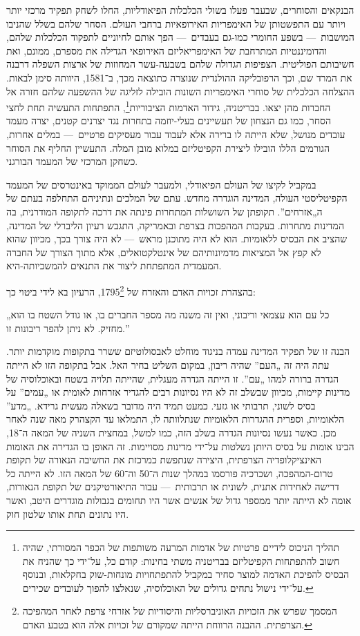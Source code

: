 הבנקאים והסוחרים, שבעבר פעלו בשולי הכלכלות הפיאודליות, החלו לשחק תפקיד מרכזי יותר ויותר עם התפשטותן של האימפריות האירופאיות ברחבי העולם. הסחר שלהם בשלל שהניבו המושבות~— בשפע החומרי כמו-גם בעבדים~— הפך אותם לחיוניים לתפקוד הכלכלות שלהם, והדומיננטיות המתרחבת של האימפריאליזם האירופאי הגדילה את מספרם, ממונם, ואת חשיבותם הפוליטית. הצפיפות הגדולה שלהם בשבעה-עשר המחוזות של ארצות השפלה דרבנה את המרד שם, וכך הרפובליקה ההולנדית שנוצרה כתוצאה מכך, ב־1581, היוותה סימן לבאות. ההצלחה הכלכלית של סוחרי האימפריות השונות הובילה לזליגה של ההשפעה שלהם חזרה אל החברות מהן יצאו. בבריטניה, גידור האדמות הציבוריות\footnote{תהליך הניכוס לידיים פרטיות של אדמות המרעה משותפות של הכפר המסורתי, שהיה חשוב להתפתחות הקפיטליזם בבריטניה משתי בחינות: קודם כל, על־ידי כך שהניח את הבסיס להפיכת האדמה למוצר סחיר במקביל להתפתחויות מונחות-שוק בחקלאות, ובנוסף על־ידי נישול נתחים גדולים של האוכלוסיה, שנאלצו להפוך לעובדים שכירים.}, התפתחות התעשיה תחת לחצי הסחר, כמו גם הנצחון של תעשיינים בעלי-יוזמה בתחרות נגד יצרנים קטנים, יצרה מעמד עובדים מנושל, שלא הייתה לו ברירה אלא לעבוד עבור מעסיקים פרטיים~— במלים אחרות, הגורמים הללו הובילו ליצירת הקפיטליזם במלוא מובן המלה. התעשיין החליף את הסוחר כשחקן המרכזי של המעמד הבורגני.

במקביל לקיצו של העולם הפיאודלי, ולמעבר לעולם הממוקד באינטרסים של המעמד הקפיטליסטי העולה, המדינה הוגדרה מחדש. עתם של המלכים ונתיניהם התחלפה בעתם של ה„אזרחים”. תקופתן של השושלות המתחרות פינתה את דרכה לתקופה המודרנית, בה המדינות מתחרות. בעקבות המהפכות בצרפת ובאמריקה, התגבש רעיון הליברלי של המדינה, שהציב את הבסיס ללאומיות. הוא לא היה מתוכנן מראש~— לא היה צורך בכך, מכיוון שהוא לא קפץ אל המציאות מדמיונותיהם של אינטלקטואלים, אלא מתוך הצורך של החברה המעמדית המתפתחת ליצור את התנאים להמשכיותה-היא.

בהצהרת זכויות האדם והאזרח של 1795\footnote{המסמך שפרש את הזכויות האוניברסליות והיסודיות של אזרחי צרפת לאחר המהפיכה הצרפתית. ההבנה הרווחת הייתה שמקורם של זכויות אלה הוא בטבע האדם.}, הרעיון בא לידי ביטוי כך: 

„כל עם הוא עצמאי וריבוני, ואין זה משנה מה מספר החברים בו, או גודל השטח בו הוא מחזיק. לא ניתן להפר ריבונות זו.”

הבנה זו של תפקיד המדינה עמדה בניגוד מוחלט לאבסולוטיזם ששרר בתקופות מוקדמות יותר. עתה היה זה „העם” שהיה ריבון, במקום השליט בחיר האל. אבל בתקופה הזו לא הייתה הגדרה ברורה למהו „עם”. זו הייתה הגדרה מעגלית, שהייתה תלויה בשטח ובאוכלוסיה של מדינות קיימות, מכיוון שבשלב זה לא היו נסיונות רבים להגדיר אזרחות לאומית או „עמים” על בסיס לשוני, תרבותי או גזעי. כמעט תמיד היה מדובר בשאלה מעשית גרידא. „מדע” הלאומיות, וספרית ההגדרות הלאומיות שנתלוותה לו, התמלאו עד הקצהרק מאה שנה לאחר מכן. כאשר נעשו נסיונות הגדרה בשלב הזה, כמו למשל, במחצית השניה של המאה ה־18, הבינו אומות על בסיס היותן נשלטות על־ידי מדינות מסויימות. זה האופן בו הגדירה את האומות האינציקלופדיה הצרפתית, היצירה שנתפשת כמרכזת את החשיבה הנאורה של תקופת טרום-המהפכה, ושכרכיה פורסמו במהלך שנות ה־50 וה־60 של המאה הזו. לא הייתה כל דרישה לאחידות אתנית, לשונית או תרבותית~— עבור התיאורטיקנים של תקופת הנאורות, אומה לא הייתה יותר ממספר גדול של אנשים אשר היו תחומים בגבולות מוגדרים היטב, ואשר היו נתונים תחת אותו שלטון חוק.

